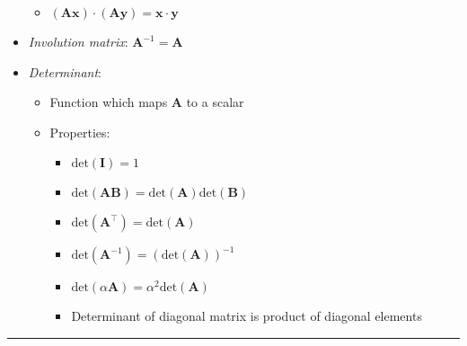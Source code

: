 \begin{itemize}
\begin{itemize}
        \item $(\boldsymbol{A}\boldsymbol{x}) \cdot (\boldsymbol{A}\boldsymbol{y}) = \boldsymbol{x} \cdot \boldsymbol{y}$
    \end{itemize}
    \item \emph{Involution matrix}: $\boldsymbol{A}^{-1} = \boldsymbol{A}$
    \item \emph{Determinant}: 
    \begin{itemize}
        \item Function which maps $\boldsymbol{A}$ to a scalar
        \item Properties:
        \begin{multicols}{2}
        \begin{itemize}
            \item $\textrm{det}(\boldsymbol{I}) = 1$
            \item $\textrm{det}(\boldsymbol{A}\boldsymbol{B}) = \textrm{det}(\boldsymbol{A})\textrm{det}(\boldsymbol{B})$
            \item $\textrm{det}(\boldsymbol{A}^\intercal) = \textrm{det}(\boldsymbol{A})$
            \item $\textrm{det}(\boldsymbol{A}^{-1}) = (\textrm{det}(\boldsymbol{A}))^{-1}$
            \item $\textrm{det}(\alpha\boldsymbol{A}) = \alpha^2\textrm{det}(\boldsymbol{A})$
            \item Determinant of diagonal matrix is product of diagonal elements
        \end{itemize}
        \end{multicols}
    \end{itemize}
    
\end{itemize}

{\color{lightgray}\hrule height 0.001mm}

